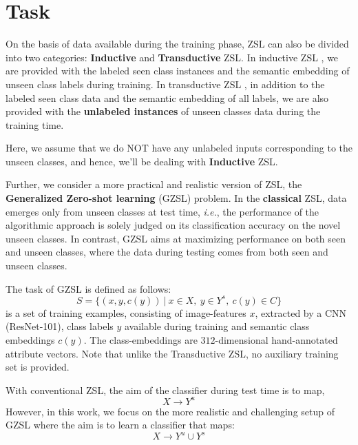 \documentclass{article}
\begin{document}
\section{Task}
\label{task}
On the basis of data available during the training phase, ZSL can also be divided into two categories: \textbf{Inductive} and \textbf{Transductive} ZSL. 
In inductive ZSL \citep{sabr10, sabr14, sabr12, sabr17, sabr23, sabr29, sabr3, sabr25}, we are provided with the labeled seen class instances and the semantic embedding of unseen class labels during training. 
In transductive ZSL \citep{sabr21, sabr28}, in addition to the labeled seen class data and the semantic embedding of all labels, 
we are also provided with the \textbf{unlabeled instances} of unseen classes data during the training time.

Here, we assume that we do NOT have any unlabeled inputs corresponding to the unseen classes, and hence, we'll be dealing with \textbf{Inductive} ZSL.

Further, we consider a more practical and realistic version of ZSL, the \textbf{Generalized Zero-shot learning} (GZSL) problem. 
In the \textbf{classical} ZSL, data emerges only from unseen classes at test time, 
\textit{i.e.}, the performance of the algorithmic approach is solely judged on its classification accuracy on the novel unseen classes. 
In contrast, GZSL aims at maximizing performance on both seen and unseen classes, where the data during testing comes from both seen and unseen classes.

The task of GZSL is defined as follows:
\begin{equation}
S = \{(x, y, c(y))~|~x \in X,~ y \in Y^s, ~c(y) \in C\}
\end{equation}
is a set of training examples, consisting of image-features $x$, extracted by a CNN (ResNet-101), 
class labels $y$ available during training and semantic class embeddings $c(y)$. 
The class-embeddings are $312$-dimensional hand-annotated attribute vectors. Note that unlike the Transductive ZSL, no auxiliary training set is provided.

With conventional ZSL, the aim of the classifier during test time is to map,
\begin{equation}
X \to Y^u
\end{equation}
However, in this work, we focus on the more realistic and challenging setup of GZSL where the aim is to learn a classifier that maps: 
\begin{equation}
X \to Y^u \cup Y^s
\end{equation}
\end{document}
